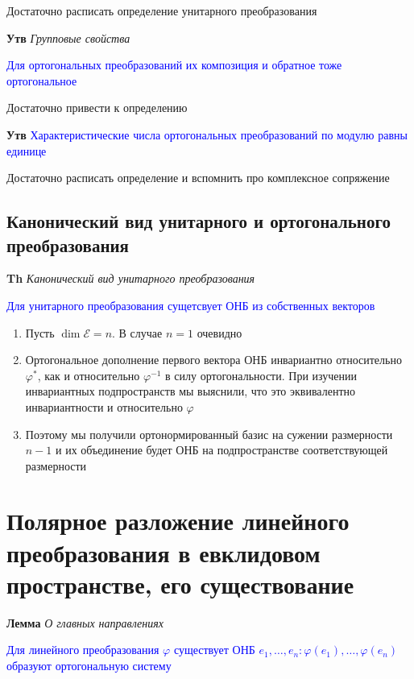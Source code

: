 \documentclass[a4paper, 14pt]{article}
\begin{document}
    Достаточно расписать определение унитарного преобразования
    
    \textbf{Утв} \textit{Групповые свойства}
    
    \textcolor{blue}{Для ортогональных преобразований их композиция и обратное тоже ортогональное}
    
    Достаточно привести к определению
    
    \textbf{Утв} \textcolor{blue}{Характеристические числа ортогональных преобразований по модулю равны единице}
    
    Достаточно расписать определение и вспомнить про комплексное сопряжение
    
    \subsection{Канонический вид унитарного и ортогонального преобразования}
    
    \textbf{Th} \textit{Канонический вид унитарного преобразования}
    
    \textcolor{blue}{Для унитарного преобразования сущетсвует ОНБ из собственных векторов}
    
    \begin{enumerate}
        \item Пусть $\dim \mathscr{E} = n$.
        В случае $n = 1$ очевидно
        \item Ортогональное дополнение первого вектора ОНБ инвариантно относительно $\varphi^*$, как и относительно $\varphi^{-1}$ в
        силу ортогональности.
        При изучении инвариантных подпространств мы выяснили, что это эквивалентно инвариантности и относительно $\varphi$
        \item Поэтому мы получили ортонормированный базис на сужении размерности $n - 1$ и их объединение будет ОНБ на
        подпространстве соответствующей размерности
    \end{enumerate}
    
    \section{Полярное разложение линейного преобразования в евклидовом пространстве, его существование}
    
    \textbf{Лемма} \textit{О главных направлениях}
    
    \textcolor{blue}{Для линейного преобразования $\varphi$ существует
    ОНБ $e_1, \dots, e_n: \varphi(e_1), \dots, \varphi(e_n)$ образуют ортогональную систему}
    
\end{document}
